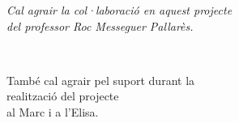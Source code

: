 \cleardoublepage

{}
\nocite{*}



\cleardoublepage

\setlength{\descriptionwidth}{0.8\linewidth}
\printglossary

\cleardoublepage
\pagestyle{empty}
\vspace*{5cm}
\begin{flushright}
\it
Cal agrair la col·laboració en aquest projecte \\
del professor Roc Messeguer Pallarès.

\

També cal agrair pel suport durant la \\
realització del projecte \\
al Marc i a l'Elisa.
\end{flushright}
\cleardoublepage

